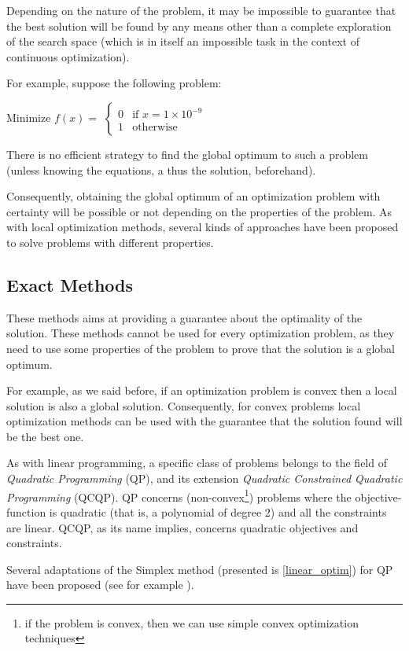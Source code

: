 Depending on the nature of the problem, it may be impossible to guarantee that the best solution will be found by any means other than a complete exploration of the search space (which is in itself an impossible task in the context of continuous optimization).

For example, suppose the following problem:

Minimize $f(x) =$ $\begin{cases}
 		 					0& \text{if } x = 1 \times 10^{-9}\\
 		 					1& \text{otherwise}
 		 			\end{cases}$
 		 			
There is no efficient strategy to find the global optimum to such a problem (unless knowing the equations, a thus the solution, beforehand).

Consequently, obtaining the global optimum of an optimization problem with certainty will be possible or not depending on the properties of the problem.
As with local optimization methods, several kinds of approaches have been proposed to solve problems with different properties.

\subsection{Exact Methods}

These methods aims at providing a guarantee about the optimality of the solution. These methods cannot be used for every optimization problem, as they need to use some properties of the problem to prove that the solution is a global optimum.

For example, as we said before, if an optimization problem is convex then a local solution is also a global solution. Consequently, for convex problems local optimization methods can be used with the guarantee that the solution found will be the best one.

As with linear programming, a specific class of problems belongs to the field of \emph{Quadratic Programming} (QP), and its extension \emph{Quadratic Constrained Quadratic Programming} (QCQP). QP concerns (non-convex\footnote{if the problem is convex, then we can use simple convex optimization techniques}) problems where the objective-function is quadratic (that is, a polynomial of degree 2) and all the constraints are linear. QCQP, as its name implies, concerns quadratic objectives and constraints.

Several adaptations of the Simplex method (presented is \ref{linear_optim}) for QP have been proposed (see for example \cite{wolfe1959simplex, dantzig1998linear, van1964simplicial}).

